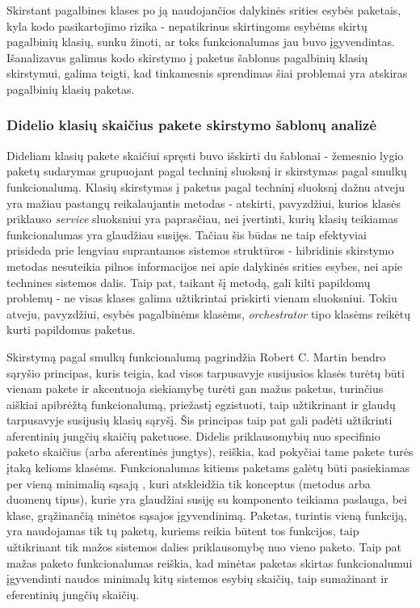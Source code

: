 Skirstant pagalbines klases po ją naudojančios dalykinės srities esybės paketais, kyla kodo pasikartojimo rizika - nepatikrinus skirtingoms esybėms skirtų pagalbinių
klasių, sunku žinoti, ar toks funkcionalumas jau buvo įgyvendintas.
Išanalizavus galimus kodo skirstymo į paketus šablonus pagalbinių klasių skirstymui, galima teigti, kad tinkamesnis sprendimas šiai
problemai yra atskiras pagalbinių klasių paketas.

\subsubsection{Didelio klasių skaičius pakete skirstymo šablonų analizė}
Dideliam klasių pakete skaičiui spręsti buvo išskirti du šablonai - žemesnio lygio paketų sudarymas grupuojant pagal techninį sluoksnį ir
skirstymas pagal smulkų funkcionalumą.
Klasių skirstymas į paketus pagal techninį sluoksnį dažnu atveju yra mažiau pastangų reikalaujantis metodas - atskirti,
pavyzdžiui, kurios klasės priklauso \textit{service} sluoksniui yra paprasčiau, nei įvertinti, kurių klasių teikiamas funkcionalumas yra glaudžiau susijęs.
Tačiau šis būdas ne taip efektyviai prisideda prie lengviau suprantamos sistemos struktūros -
hibridinis skirstymo metodas nesuteikia pilnos informacijos nei apie dalykinės srities esybes, nei apie technines sistemos dalis.
Taip pat, taikant šį metodą, gali kilti papildomų problemų - ne visas klases galima užtikrintai priskirti vienam sluoksniui.
Tokiu atveju, pavyzdžiui, esybės pagalbinėms klasėms, \textit{orchestrator} tipo klasėms reikėtų kurti papildomus paketus.

Skirstymą pagal smulkų funkcionalumą pagrindžia Robert C. Martin bendro sąryšio principas, kuris teigia, kad visos tarpusavyje susijusios klasės turėtų būti vienam pakete ir
akcentuoja siekiamybę turėti gan mažus paketus, turinčius aiškiai apibrėžtą funkcionalumą, priežastį egzistuoti, taip užtikrinant ir
glaudų tarpusavyje susijusių klasių sąryšį.
Šis principas taip pat gali padėti užtikrinti aferentinių jungčių skaičių paketuose.
Didelis priklausomybių nuo specifinio paketo skaičius (arba aferentinės jungtys), reiškia, kad pokyčiai tame pakete turės įtaką kelioms klasėms.
Funkcionalumas kitiems paketams galėtų būti pasiekiamas per vieną minimalią sąsają ,
kuri atskleidžia tik konceptus (metodus arba duomenų tipus), kurie yra glaudžiai susiję su komponento teikiama paslauga, bei
klase, grąžinančią minėtos sąsajos įgyvendinimą.
Paketas, turintis vieną funkciją, yra naudojamas tik tų paketų, kuriems reikia būtent tos funkcijos,
taip užtikrinant tik mažos sistemos dalies priklausomybę nuo vieno paketo.
Taip pat mažas paketo funkcionalumas reiškia, kad minėtas paketas skirtas funkcionalumui įgyvendinti naudos minimalų kitų sistemos esybių skaičių,
taip sumažinant ir eferentinių jungčių skaičių.

